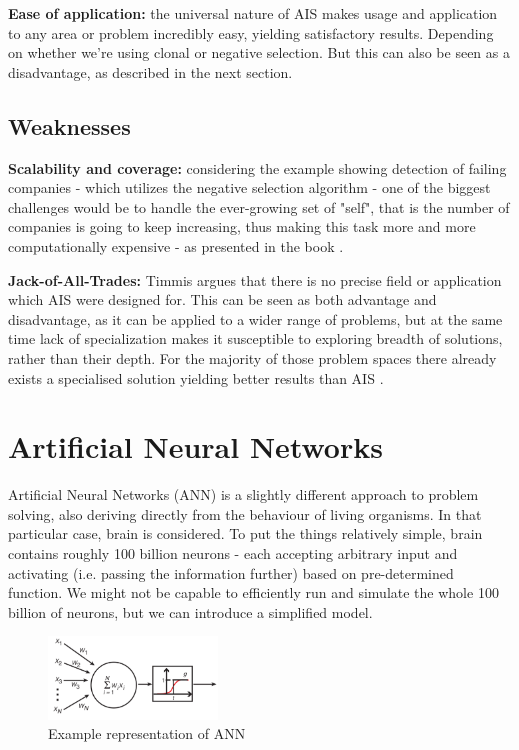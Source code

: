 \documentclass[letterpaper, 10 pt, conference]{ieeeconf}  %
\begin{document}
\textbf{Ease of application:} the universal nature of AIS makes usage and application to any area or problem incredibly easy, yielding satisfactory results. Depending on whether we're using clonal or negative selection. But this can also be seen as a disadvantage, as described in the next section.

\subsection{Weaknesses}
\textbf{Scalability and coverage:} considering the example showing detection of failing companies - which utilizes the negative selection algorithm - one of the biggest challenges would be to handle the ever-growing set of "self", that is the number of companies is going to keep increasing, thus making this task more and more computationally expensive - as presented in the book \cite{brabazon2006biologically}.

\textbf{Jack-of-All-Trades:} Timmis argues \cite{timmis2004overview} that there is no precise field or application which AIS were designed for. This can be seen as both advantage and disadvantage, as it can be applied to a wider range of problems, but at the same time lack of specialization makes it susceptible to exploring breadth of solutions, rather than their depth. For the majority of those problem spaces there already exists a specialised solution yielding better results than AIS \cite{garrett2005we}.

\section{Artificial Neural Networks}
Artificial Neural Networks (ANN) is a slightly different approach to problem solving, also deriving directly from the behaviour of living organisms. In that particular case, brain is considered. To put the things relatively simple, brain contains roughly 100 billion neurons \cite{lent2012many} - each accepting arbitrary input and activating (i.e. passing the information further) based on pre-determined function. We might not be capable to efficiently run and simulate the whole 100 billion of neurons, but we can introduce a simplified model.

\begin{figure}[h!]
  \centering
  \includegraphics[width=0.4\textwidth]{ann}
  \caption{Example representation of ANN \cite{krogh2008artificial}}
  \label{fig:ann}
\end{figure}
\end{document}
